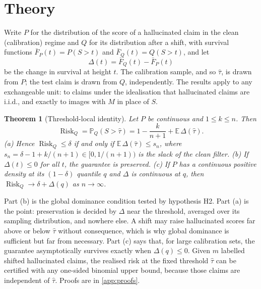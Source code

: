 \documentclass[journal]{IEEEtran}
\newtheorem{theorem}{Theorem}
\theoremstyle{remark}\newtheorem{remark}{Remark}
\DeclareMathOperator{\Risk}{Risk}
\newcommand{\Sbar}{\bar F}
\renewcommand{\Pr}{\mathbb{P}}
\newcommand{\E}{\mathbb{E}}
\begin{document}
\section{Theory}\label{sec:theory}
Write $P$ for the distribution of the score of a hallucinated claim in the clean (calibration) regime and $Q$ for its distribution after a shift, with survival functions $\Sbar_P(t)=P(S>t)$ and $\Sbar_Q(t)=Q(S>t)$, and let
\begin{equation}\label{eq:delta}
\Delta(t)=\Sbar_Q(t)-\Sbar_P(t)
\end{equation}
be the change in survival at height $t$. The calibration sample, and so $\hat\tau$, is drawn from $P$; the test claim is drawn from $Q$, independently. The results apply to any exchangeable unit: to claims under the idealisation that hallucinated claims are i.i.d., and exactly to images with $M$ in place of $S$.

\begin{theorem}[Threshold-local identity]\label{thm:local}
Let $P$ be continuous and $1\le k\le n$. Then
\begin{equation}\label{eq:local}
\Risk_Q=\Pr_Q(S>\hat\tau)=1-\frac{k}{n+1}+\E\,\Delta(\hat\tau).
\end{equation}
(a) Hence $\Risk_Q\le\delta$ if and only if $\E\,\Delta(\hat\tau)\le s_n$, where $s_n=\delta-1+k/(n+1)\in[0,1/(n+1))$ is the slack of the clean filter.
(b) If $\Delta(t)\le0$ for all $t$, the guarantee is preserved.
(c) If $P$ has a continuous positive density at its $(1-\delta)$ quantile $q$ and $\Delta$ is continuous at $q$, then $\Risk_Q\to\delta+\Delta(q)$ as $n\to\infty$.
\end{theorem}
Part (b) is the global dominance condition tested by hypothesis H2. Part (a) is the point: preservation is decided by $\Delta$ near the threshold, averaged over its sampling distribution, and nowhere else. A shift may raise hallucinated scores far above or below $\hat\tau$ without consequence, which is why global dominance is sufficient but far from necessary. Part (c) says that, for large calibration sets, the guarantee asymptotically survives exactly when $\Delta(q)\le0$. Given $m$ labelled shifted hallucinated claims, the realised risk at the fixed threshold $\hat\tau$ can be certified with any one-sided binomial upper bound, because those claims are independent of $\hat\tau$. Proofs are in \cref{app:proofs}.
\end{document}
